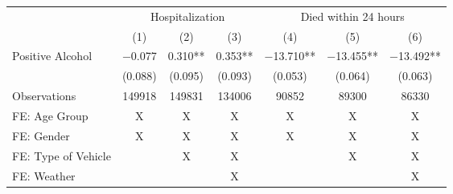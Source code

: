 
\begin{tabular}[t]{lcccccc}
\toprule
\multicolumn{1}{c}{ } & \multicolumn{3}{c}{Hospitalization} & \multicolumn{3}{c}{Died within 24 hours} \\
\cmidrule(l{3pt}r{3pt}){2-4} \cmidrule(l{3pt}r{3pt}){5-7}
  & (1) & (2) & (3) & (4) & (5) & (6)\\
\midrule
Positive Alcohol & \num{-0.077} & \num{0.310}** & \num{0.353}** & \num{-13.710}** & \num{-13.455}** & \num{-13.492}**\\
 & (\num{0.088}) & (\num{0.095}) & (\num{0.093}) & (\num{0.053}) & (\num{0.064}) & (\num{0.063})\\
\midrule
Observations & \num{149918} & \num{149831} & \num{134006} & \num{90852} & \num{89300} & \num{86330}\\
FE: Age Group & X & X & X & X & X & X\\
FE: Gender & X & X & X & X & X & X\\
FE: Type of Vehicle &  & X & X &  & X & X\\
FE: Weather &  &  & X &  &  & X\\
\midrule
\bottomrule
\end{tabular}
